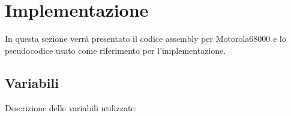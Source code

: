 \documentclass{article}
\begin{document}


\section{Implementazione}
In questa sezione verrà presentato il codice assembly per Motorola68000 e lo pseudocodice usato come riferimento per l'implementazione.

\subsection{Variabili}
Descrizione delle variabili utilizzate: 
\\
\end{document}
